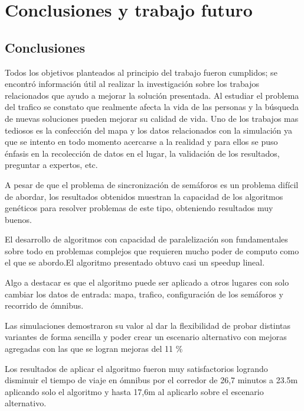 \chapter{Conclusiones y trabajo futuro}

\section{Conclusiones}
Todos los objetivos planteados al principio del trabajo fueron cumplidos; se encontró información útil al realizar la investigación sobre los trabajos relacionados que ayudo a mejorar la solución presentada. 
Al estudiar el problema del trafico se constato que realmente afecta la vida de las personas y la búsqueda de nuevas soluciones pueden mejorar su calidad de vida.
Uno de los trabajos mas tediosos es la confección del mapa y los datos relacionados con la simulación ya que se intento en todo momento acercarse a la realidad y para ellos se puso énfasis en la recolección de datos en el lugar, la validación de los resultados, preguntar a expertos, etc.



 
A pesar de que el problema de sincronización de semáforos es un problema difícil de abordar, los resultados obtenidos
muestran la capacidad de los algoritmos genéticos para resolver problemas de este tipo, obteniendo resultados muy buenos. 


El desarrollo de algoritmos con capacidad de paralelización son fundamentales sobre  todo en problemas complejos que requieren mucho poder de computo como el que se abordo.El algoritmo presentado obtuvo casi un speedup lineal.

Algo a destacar es que el algoritmo puede ser aplicado a otros lugares con solo cambiar los datos de entrada: mapa, trafico, configuración de los semáforos y recorrido de ómnibus.

Las simulaciones demostraron su valor al dar la flexibilidad de probar distintas variantes de forma sencilla y poder crear un escenario alternativo con mejoras agregadas con las que se logran mejoras del 11 \%

Los resultados de aplicar el algoritmo fueron muy satisfactorios logrando disminuir el tiempo de viaje en ómnibus por el corredor de 26,7 minutos a 23.5m aplicando solo el algoritmo y hasta 17,6m al aplicarlo sobre el escenario alternativo.


